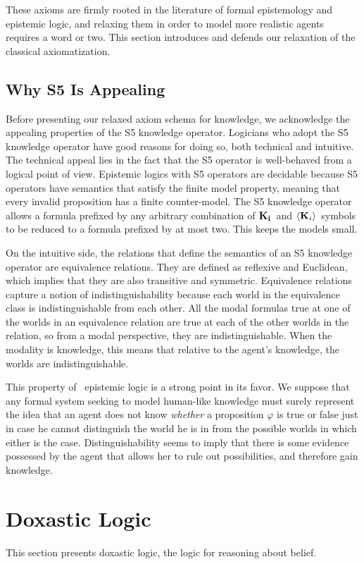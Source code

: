 These axioms are firmly rooted in the literature of formal epistemology and epistemic logic, and relaxing them in order to model more realistic agents requires a word or two. This section introduces and defends our relaxation of the classical axiomatization.

\subsection{Why S5 Is Appealing} 
Before presenting our relaxed axiom schema for knowledge, we acknowledge the appealing properties of the S5 knowledge operator. Logicians who adopt the S5 knowledge operator have good reasons for doing so, both technical and intuitive. The technical appeal lies in the fact that the S5 operator is well-behaved from a logical point of view. Epistemic logics with S5 operators are decidable because S5 operators have semantics that satisfy the finite model property, meaning that every invalid proposition has a finite counter-model. The S5 knowledge operator allows a formula prefixed by any arbitrary combination of $\mathbf{K}_{\mathbf{i}}\,$ and $\langle \mathbf{K}_{i} \rangle\,$ symbols to be reduced to a formula prefixed by at most two. This keeps the models small.

On the intuitive side, the relations that define the semantics of an S5 knowledge operator are equivalence relations. They are defined as reflexive and Euclidean, which implies that they are also transitive and symmetric. Equivalence relations capture a notion of indistinguishability because each world in the equivalence class is indistinguishable from each other. All the modal formulas true at one of the worlds in an equivalence relation are true at each of the other worlds in the relation, so from a modal perspective, they are indistinguishable. When the modality is knowledge, this means that relative to the agent's knowledge, the worlds are indistinguishable. 

This property of \SFive\ epistemic logic is a strong point in its favor. We suppose that any formal system seeking to model human-like knowledge must surely represent the idea that an agent does not know \emph{whether} a proposition $\varphi$ is true or false just in case he cannot distinguish the world he is in from the possible worlds in which either is the case. Distinguishability seems to imply that there is some evidence possessed by the agent that allows her to rule out possibilities, and therefore gain knowledge.

\section{Doxastic Logic}
This section presents doxastic logic, the logic for reasoning about belief.



